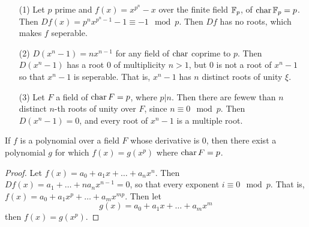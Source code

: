 \begin{example}\label{example_1.15}
    \begin{enumerate}
        \item[(1)] Let $p$ prime and $f(x)=x^{p^n}-x$ over the finite field
            $\mathbb{F}_p$, of $\operatorname{char}{\mathbb{F}_p}=p$. Then $D{f}(x)=p^nx^{p^n-1}-1 \equiv -1
            \mod{p}$. Then $D{f}$ has no roots, which makes $f$ seperable.

        \item[(2)] $D{(x^n-1)}=nx^{n-1}$ for any field of $\operatorname{char}$ coprime to
            $p$. Then  $D{(x^n-1)}$ has a root $0$ of multiplicity  $n>1$, but
            $0$ is not a root of  $x^n-1$ so that  $x^n-1$ is seperable. That
            is,  $x^n-1$ has  $n$ distinct roots of unity  $\xi$.

        \item[(3)] Let $F$ a field of  $\operatorname{char}{F}=p$, where $p|n$. Then there are
            fewew than $n$ distinct  $n$-th roots of unity over $F$, since $n
            \equiv 0 \mod{p}$. Then $D{(x^n-1)}=0$, and every root of $x^n-1$ is
            a multiple root.
    \end{enumerate}
\end{example}

\begin{lemma}\label{1.6.5}
    If $f$ is a polynomial over a field $F$ whose derivative is  $0$, then there
    exist a polynomial  $g$ for which $f(x)=g(x^p)$ where $\operatorname{char}{F}=p$.
\end{lemma}
\begin{proof}
    Let $f(x)=a_0+a_1x+\dots+a_nx^n$. Then $D{f}(x)=a_1+\dots+na_nx^{n-1}=0$, so
    that every exponent $i \equiv 0 \mod{p}$. That is,
    $f(x)=a_0+a_1x^p+\dots+a_mx^{mp}$. Then let
    \begin{equation*}
        g(x)=a_0+a_1x+\dots+a_mx^m
    \end{equation*}
    then $f(x)=g(x^p)$.
\end{proof}

